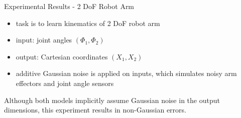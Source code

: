 \documentclass{beamer}
\begin{document}

\begin{frame}{Experimental Results - 2 DoF Robot Arm}
\begin{itemize}
\item task is to learn kinematics of 2 DoF robot arm
\item input: joint angles $(\Phi_1,\Phi_2)$
\item output: Cartesian coordinates $(X_1,X_2)$
\item additive Gaussian noise is applied on inputs, which simulates
  noisy arm effectors and joint angle sensors
\end{itemize}
Although both models implicitly assume Gaussian noise in the output dimensions,
this experiment results in non-Gaussian errors.
\end{frame}

\end{document}
